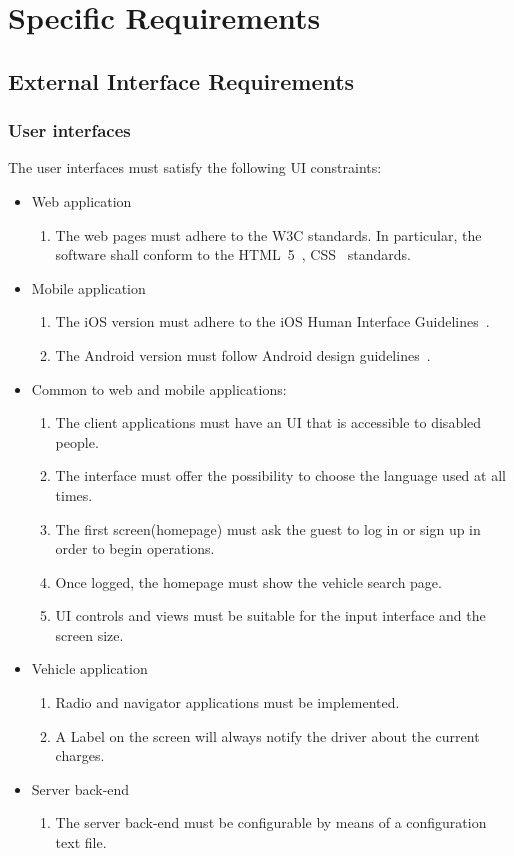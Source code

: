 \section{Specific Requirements}\label{sec requirements}

\subsection{External Interface Requirements}

\subsubsection{User interfaces}

The user interfaces must satisfy the following UI constraints:
\begin{itemize}
	\item Web application
	\begin{enumerate}
		\item The web pages must adhere to the W3C standards. In particular, the software shall conform to the HTML~5~\cite{w3c-html5}, CSS~\cite{w3c-css} standards.
	\end{enumerate}
	\item Mobile application
	\begin{enumerate}
		\item The iOS version must adhere to the iOS Human Interface Guidelines~\cite{apple-ios-hig}.
		\item The Android version must follow Android design guidelines~\cite{google-android-hig}.
	\end{enumerate}
		\item Common to web and mobile applications:
		\begin{enumerate}
			\item The client applications must have an UI that is accessible to disabled people.
			\item The interface must offer the possibility to choose the language used at all times.
			\item The first screen(homepage) must ask the guest to log in or sign up in order to begin operations.
			\item Once logged, the homepage must show the vehicle search page.
			\item UI controls and views must be suitable for the input interface and the screen size.
		\end{enumerate}
	\item Vehicle application
	\begin{enumerate}
		\item Radio and navigator applications must be implemented.
		\item A Label on the screen will always notify the driver about the current charges.
	\end{enumerate}
	\item Server back-end
	\begin{enumerate}
		\item The server back-end must be configurable by means of a configuration text file.
	\end{enumerate}
	

\end{itemize}
